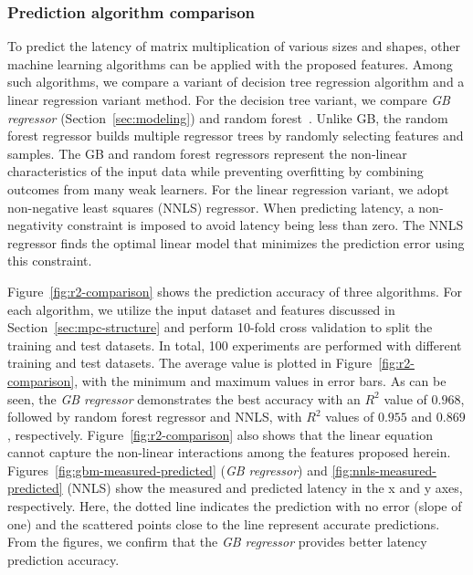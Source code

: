 \documentclass[10pt, conference, compsocconf]{IEEEtran}
\begin{document}
\subsubsection{Prediction algorithm comparison}
To predict the latency of matrix multiplication of various sizes and shapes, other machine learning algorithms can be applied with the proposed features. Among such algorithms, we compare a variant of decision tree regression algorithm and a linear regression variant method. For the decision tree variant, we compare \textit{GB regressor} (Section~\ref{sec:modeling}) and random forest~\cite{random-forest}. Unlike GB, the random forest regressor builds multiple regressor trees by randomly selecting features and samples. The GB and random forest regressors represent the non-linear characteristics of the input data while preventing overfitting by combining outcomes from many weak learners. For the linear regression variant, we adopt non-negative least squares (NNLS) regressor. When predicting latency, a non-negativity constraint is imposed to avoid latency being less than zero. The NNLS regressor finds the optimal linear model that minimizes the prediction error using this constraint.

Figure~\ref{fig:r2-comparison} shows the prediction accuracy of three algorithms. For each algorithm, we utilize the input dataset and features discussed in Section~\ref{sec:mpc-structure} and perform 10-fold cross validation to split the training and test datasets. In total, 100 experiments are performed with different training and test datasets. The average value is plotted in Figure~\ref{fig:r2-comparison}, with the minimum and maximum values in error bars. As can be seen, the \textit{GB regressor} demonstrates the best accuracy with an $R^2$ value of $0.968$, followed by random forest regressor and NNLS, with  $R^2$ values of $0.955$ and $0.869$, respectively. Figure~\ref{fig:r2-comparison} also shows that the linear equation cannot capture the non-linear interactions among the features proposed herein. Figures~\ref{fig:gbm-measured-predicted} (\textit{GB regressor}) and \ref{fig:nnls-measured-predicted} (NNLS) show the measured and predicted latency in the x and y axes, respectively. Here, the dotted line indicates the prediction with no error (slope of one) and the scattered points close to the line represent accurate predictions. From the figures, we confirm that the \textit{GB regressor} provides better latency prediction accuracy.
\end{document}
